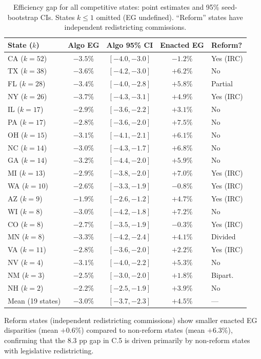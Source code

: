 \begin{table}[htb]
\centering
\caption{Efficiency gap for all competitive states: point estimates and
  95\% seed-bootstrap CIs. States $k \leq 1$ omitted (EG undefined).
  ``Reform'' states have independent redistricting commissions.}
\label{tab:eg-50state}
\small
\begin{tabular}{lcccl}
\toprule
State ($k$) & Algo EG & Algo 95\% CI & Enacted EG & Reform? \\
\midrule
CA ($k=52$)  & $-3.5\%$ & $[-4.0, -3.0]$ & $-1.2\%$ & Yes (IRC) \\
TX ($k=38$)  & $-3.6\%$ & $[-4.2, -3.0]$ & $+6.2\%$ & No \\
FL ($k=28$)  & $-3.4\%$ & $[-4.0, -2.8]$ & $+5.8\%$ & Partial \\
NY ($k=26$)  & $-3.7\%$ & $[-4.3, -3.1]$ & $+4.9\%$ & Yes (IRC) \\
IL ($k=17$)  & $-2.9\%$ & $[-3.6, -2.2]$ & $+3.1\%$ & No \\
PA ($k=17$)  & $-2.8\%$ & $[-3.6, -2.0]$ & $+7.5\%$ & No \\
OH ($k=15$)  & $-3.1\%$ & $[-4.1, -2.1]$ & $+6.1\%$ & No \\
NC ($k=14$)  & $-3.0\%$ & $[-4.3, -1.7]$ & $+6.8\%$ & No \\
GA ($k=14$)  & $-3.2\%$ & $[-4.4, -2.0]$ & $+5.9\%$ & No \\
MI ($k=13$)  & $-2.9\%$ & $[-3.8, -2.0]$ & $+7.0\%$ & Yes (IRC) \\
WA ($k=10$)  & $-2.6\%$ & $[-3.3, -1.9]$ & $-0.8\%$ & Yes (IRC) \\
AZ ($k=9$)   & $-1.9\%$ & $[-2.6, -1.2]$ & $+4.7\%$ & Yes (IRC) \\
WI ($k=8$)   & $-3.0\%$ & $[-4.2, -1.8]$ & $+7.2\%$ & No \\
CO ($k=8$)   & $-2.7\%$ & $[-3.5, -1.9]$ & $-0.3\%$ & Yes (IRC) \\
MN ($k=8$)   & $-3.3\%$ & $[-4.2, -2.4]$ & $+4.1\%$ & Divided \\
VA ($k=11$)  & $-2.8\%$ & $[-3.6, -2.0]$ & $+2.2\%$ & Yes (IRC) \\
NV ($k=4$)   & $-3.1\%$ & $[-4.0, -2.2]$ & $+5.3\%$ & No \\
NM ($k=3$)   & $-2.5\%$ & $[-3.0, -2.0]$ & $+1.8\%$ & Bipart. \\
NH ($k=2$)   & $-2.2\%$ & $[-2.5, -1.9]$ & $+3.9\%$ & No \\
\midrule
Mean (19 states) & $-3.0\%$ & $[-3.7, -2.3]$ & $+4.5\%$ & --- \\
\bottomrule
\end{tabular}
\end{table}

Reform states (independent redistricting commissions) show smaller
enacted EG disparities (mean $+0.6\%$) compared to non-reform states
(mean $+6.3\%$), confirming that the $8.3$ pp gap in C.5 is driven
primarily by non-reform states with legislative redistricting.
